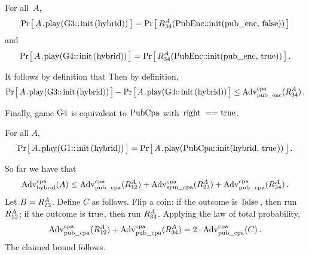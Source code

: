 \begin{claim}
  For all~$A$,
  \[
    \Prob{A\code{.play(G3::init(hybrid))}} =
    \Prob{R_{\code{34}}^A(\code{PubEnc::init(pub_enc, false)})}
  \]
  and
  \[
    \Prob{A\code{.play(G4::init(hybrid))}} =
    \Prob{R_{\code{34}}^A(\code{PubEnc::init(pub_enc, true)})} \,.
  \]
\end{claim}
%
%
It follows by definition that
%
Then by definition,
%
\[
  \Prob{A\code{.play(G3::init(hybrid))}} -
  \Prob{A\code{.play(G4::init(hybrid))}} \leq
  \Adv{cpa}_\code{pub_enc}(R_{\code{34}}^A) \,.
\]

Finally, game $\code{G4}$ is equivalent to $\code{PubCpa}$ with $\code{right ==
true}$.
%
\begin{claim}
  For all $A$,
  \[
     \Prob{A\code{.play(G1::init(hybrid))}} =
     \Prob{A\code{.play(PubCpa::init(hybrid, true))}} \,.
  \]
\end{claim}
%

So far we have that
%
\[
  \Adv{cpa}_\code{hybrid}(A) \leq
    \Adv{cpa}_\code{pub_cpa}(R_{\code{12}}^A) +
    \Adv{cpa}_\code{sym_cpa}(R_{\code{23}}^A) +
    \Adv{cpa}_\code{pub_cpa}(R_{\code{34}}^A) \,.
\]
%
Let $B = R_{\code{23}}^A$.
%
Define $C$ as follows. Flip a coin: if the outcome is $\code{false}$, then run
$R_{\code{12}}^A$; if the outcome is $\code{true}$, then run $R_{\code{34}}^A$.
%
Applying the law of total probability,
%
\[
  \Adv{cpa}_\code{pub_cpa}(R_{\code{12}}^A) +
  \Adv{cpa}_\code{pub_cpa}(R_{\code{34}}^A)
  = 2\cdot \Adv{cpa}_\code{pub_cpa}(C) \,.
\]
%
The claimed bound follows.
